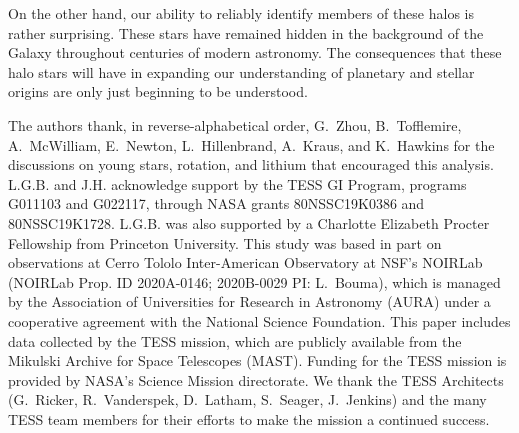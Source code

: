 \documentclass[12pt,twocolumn,tighten]{aastex63}
\begin{document}
On the other hand, our ability to reliably identify members of these
halos is rather surprising.  These stars have remained hidden in the
background of the Galaxy throughout centuries of modern astronomy.
The consequences that these halo stars will have in expanding our
understanding of planetary and stellar origins are only just beginning
to be understood.




\acknowledgements
\raggedbottom

The authors thank, in reverse-alphabetical order, G.~Zhou,
B.~Tofflemire, A.~McWilliam, E.~Newton, L.~Hillenbrand, A.~Kraus, and
K.~Hawkins for the discussions on young stars, rotation, and lithium
that encouraged this analysis.
%
L.G.B. and J.H. acknowledge support by the TESS GI Program, programs
G011103 and G022117, through NASA grants 80NSSC19K0386 and
80NSSC19K1728.
%
L.G.B. was also supported by a Charlotte Elizabeth Procter Fellowship
from Princeton University.
%
This study was based in part on observations at Cerro Tololo
Inter-American Observatory at NSF's NOIRLab (NOIRLab Prop. ID
2020A-0146; 2020B-0029 PI: L{.}~Bouma), which is managed by the
Association of Universities for Research in Astronomy (AURA) under a
cooperative agreement with the National Science Foundation.
%
%
This paper includes data collected by the TESS mission, which are
publicly available from the Mikulski Archive for Space Telescopes
(MAST).
%
Funding for the TESS mission is provided by NASA's Science Mission
directorate.
%
We thank the TESS Architects (G.~Ricker, R.~Vanderspek, D.~Latham,
S.~Seager, J.~Jenkins) and the many TESS team members for their
efforts to make the mission a continued success.
%

%
%


%
\end{document}
